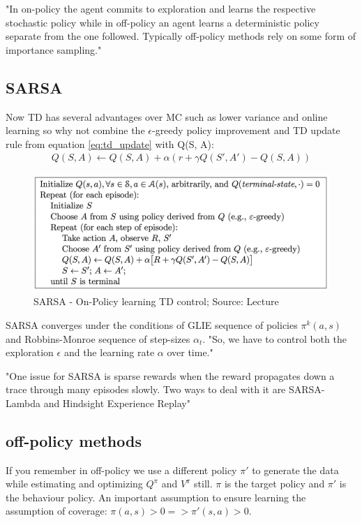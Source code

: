 "In on-policy the agent commits to exploration and learns the respective stochastic policy while in off-policy an agent learns a deterministic policy separate from the one followed. Typically off-policy methods rely on some form of importance sampling."

\subsection{SARSA}
Now TD has several advantages over MC such as lower variance and online learning so why not combine the $\epsilon$-greedy policy improvement and TD update rule from equation \ref{eq:td_update} with Q(S, A):
\begin{align}
    Q(S, A) \longleftarrow Q(S, A) + \alpha (r + \gamma Q(S', A') - Q(S, A)) \label{eq:sarsa_update_rule}
\end{align}

\begin{figure}[h!]
  \centering
  \includegraphics[scale=0.5]{figures/sarsa.PNG}
  \caption{SARSA - On-Policy learning TD control; Source: Lecture}
  \label{fig:sarsa}
\end{figure}

SARSA converges under the conditions of GLIE sequence of policies $\pi^k(a, s)$ and Robbins-Monroe sequence of step-sizes $\alpha_t$. "So, we have to control both the exploration $\epsilon$ and the learning rate
$\alpha$ over time."

"One issue for SARSA is sparse rewards when the reward 
propagates down a trace through many episodes slowly. Two ways to deal with it are SARSA-Lambda and Hindsight Experience Replay"

\subsection{off-policy methods}

If you remember in off-policy we use a different policy $\pi'$ to generate the data while estimating and optimizing $Q^{\pi}$ and $V^{\pi}$ still. $\pi$ is the target policy and $\pi'$ is the  behaviour policy. An important assumption to ensure learning the assumption of coverage: $\pi(a, s) > 0 => \pi'(s, a) > 0$.\\

